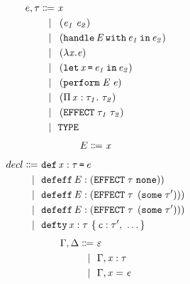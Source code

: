 \begin{multicols}{2}
	\begin{align*}
		e, \tau\Coloneqq&\ \mathit{x}\\
		\lvert\ &\ \left(\mathit{e_1}\;\mathit{e_2}\right)\\
		\lvert\ &\ \left(\texttt{handle}\,\mathit{E}\,\texttt{with}\,\mathit{e_1}\,\texttt{in}\,\mathit{e_2}\right)\\
		\lvert\ &\ \left(\lambda\mathit{x}.\mathit{e}\right)\\
		\lvert\ &\ \left(\texttt{let}\,\mathit{x}\,\texttt{=}\,\mathit{e_1}\,\texttt{in}\,\mathit{e_2}\right)\\
		\lvert\ &\ \left(\texttt{perform}\;\mathit{E}\;\mathit{e}\right)\\
		\lvert\ &\ \left(\Pi\,\mathit{x}:\mathit{\tau_1}.\ \mathit{\tau_2}\right)\\
		\lvert\ &\ \left(\texttt{EFFECT}\;\mathit{\tau_1}\;\mathit{\tau_2}\right)\\
		\lvert\ &\ \texttt{TYPE}\\
	\end{align*}
	\begin{align*}
		E\Coloneqq&\ \mathit{x}\\
	\end{align*}
	\break
	\begin{align*}
		\DefineTerm{decl}{\StahlDef{x}{\StahlName{\tau}}{\StahlName{e}}}
		\Case{\StahlDefEffNoReturn{E}{\StahlName{\tau}}}
		\Case{\StahlDefEff{E}{\StahlName{\tau}}{\StahlName{\tau'}}}
		\Case{\StahlDefEff{E}{\StahlName{\tau}}{\StahlName{\tau'}}}
		\Case{\StahlDefTy{x}{\StahlName{\tau}}{\StahlCtor{c}{\tau'},\ \ldots}}
	\end{align*}
	\begin{align*}
		\Gamma, \Delta\Coloneqq&\ \varepsilon\\
		\lvert\ &\ \Gamma,\mathit{x}:\mathit{\tau}\\
		\lvert\ &\ \Gamma,\mathit{x}=\mathit{e}\\
	\end{align*}
\end{multicols}
